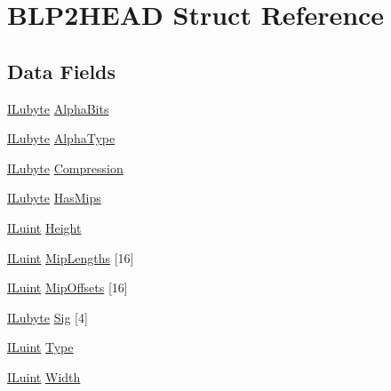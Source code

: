 \hypertarget{struct_b_l_p2_h_e_a_d}{\section{B\-L\-P2\-H\-E\-A\-D Struct Reference}
\label{struct_b_l_p2_h_e_a_d}
}
\subsection*{Data Fields}
\begin{DoxyCompactItemize}
\item 
\hyperlink{il_8h_a8d2f04500100a86d1b00e98ab1b15a33}{I\-Lubyte} \hyperlink{struct_b_l_p2_h_e_a_d_a2fa373ca7f0b430dc4cce24621c462d6}{Alpha\-Bits}
\item 
\hyperlink{il_8h_a8d2f04500100a86d1b00e98ab1b15a33}{I\-Lubyte} \hyperlink{struct_b_l_p2_h_e_a_d_a04ab5085efde8d4fee92f249fb8e189a}{Alpha\-Type}
\item 
\hyperlink{il_8h_a8d2f04500100a86d1b00e98ab1b15a33}{I\-Lubyte} \hyperlink{struct_b_l_p2_h_e_a_d_a258fbb5a0b794861010e504a10a89be1}{Compression}
\item 
\hyperlink{il_8h_a8d2f04500100a86d1b00e98ab1b15a33}{I\-Lubyte} \hyperlink{struct_b_l_p2_h_e_a_d_a906b5fb408fbaff71a312ae531b8690a}{Has\-Mips}
\item 
\hyperlink{il_8h_ac6508d0e9c19e32f32e00d54b5b8cf30}{I\-Luint} \hyperlink{struct_b_l_p2_h_e_a_d_a8a8093d76b61a95fc96df24af29b107a}{Height}
\item 
\hyperlink{il_8h_ac6508d0e9c19e32f32e00d54b5b8cf30}{I\-Luint} \hyperlink{struct_b_l_p2_h_e_a_d_ab471413d9fd3a00d58f6e262e5672aea}{Mip\-Lengths} \mbox{[}16\mbox{]}
\item 
\hyperlink{il_8h_ac6508d0e9c19e32f32e00d54b5b8cf30}{I\-Luint} \hyperlink{struct_b_l_p2_h_e_a_d_ae1442afe5a13d54073c68f22baca4fb3}{Mip\-Offsets} \mbox{[}16\mbox{]}
\item 
\hyperlink{il_8h_a8d2f04500100a86d1b00e98ab1b15a33}{I\-Lubyte} \hyperlink{struct_b_l_p2_h_e_a_d_a44e23e3cb794abbb3bf035a7c72e0a14}{Sig} \mbox{[}4\mbox{]}
\item 
\hyperlink{il_8h_ac6508d0e9c19e32f32e00d54b5b8cf30}{I\-Luint} \hyperlink{struct_b_l_p2_h_e_a_d_a0dfd5e410737b8035ece841196919127}{Type}
\item 
\hyperlink{il_8h_ac6508d0e9c19e32f32e00d54b5b8cf30}{I\-Luint} \hyperlink{struct_b_l_p2_h_e_a_d_a4146e7b2b0b4097e0e335f9b348392bf}{Width}
\end{DoxyCompactItemize}


